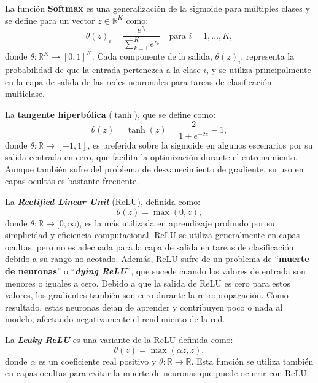 La función \textbf{Softmax} es una generalización de la sigmoide para múltiples clases y se define para un vector \( z \in \mathbb{R}^K \) como:
\begin{equation}
	\theta(z)_i = \frac{e^{z_i}}{\sum_{k=1}^K e^{z_k}} \quad \text{para } i = 1, \ldots, K,
\end{equation}
donde \( \theta : \mathbb{R}^K \to [0,1]^K \). Cada componente de la salida, \(\theta(z)_i\), representa la probabilidad de que la entrada pertenezca a la clase \(i\), y se utiliza principalmente en la capa de salida de las redes neuronales para tareas de clasificación multiclase.

La \textbf{tangente hiperbólica} (\(\tanh\)), que se define como:
\begin{equation}
	\theta(z) = \tanh(z) = \frac{2}{1 + e^{-2z}} - 1,
\end{equation}
donde \( \theta : \mathbb{R} \to [-1,1] \), es preferida sobre la sigmoide en algunos escenarios por su salida centrada en cero, que facilita la optimización durante el entrenamiento. Aunque también sufre del problema de desvanecimiento de gradiente, su uso en capas ocultas es bastante frecuente.

La \textbf{\textit{Rectified Linear Unit}} (ReLU), definida como:
\begin{equation}
	\theta(z) = \max(0, z),
\end{equation}
donde \( \theta : \mathbb{R} \to [0, \infty) \), es la más utilizada en aprendizaje profundo por su simplicidad y eficiencia computacional. ReLU se utiliza generalmente en capas ocultas, pero no es adecuada para la capa de salida en tareas de clasificación debido a su rango no acotado. Además, ReLU sufre de un problema de \enquote{\textbf{muerte de neuronas}} o \enquote{\textbf{\textit{dying ReLU}}}, que sucede cuando los valores de entrada son menores o iguales a cero. Debido a que la salida de ReLU es cero para estos valores, los gradientes también son cero durante la retropropagación. Como resultado, estas neuronas dejan de aprender y contribuyen poco o nada al modelo, afectando negativamente el rendimiento de la red.

La \textbf{\textit{Leaky ReLU}} es una variante de la ReLU definida como:
\begin{equation}
	\theta(z) = \max(\alpha z, z),
\end{equation}
donde \( \alpha \) es un coeficiente real positivo y \( \theta : \mathbb{R} \to \mathbb{R} \). Esta función se utiliza también en capas ocultas para evitar la muerte de neuronas que puede ocurrir con ReLU.

